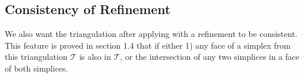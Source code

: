     
    \subsection{Consistency of Refinement}
    We also want the triangulation after applying with a refinement to be consistent. This feature is proved in section 1.4 that if either 1) any face of a simplex from this triangulation $\mathcal{T}$ is also in $\mathcal{T}$, or the intersection of any two simplices in a face of both simplices.